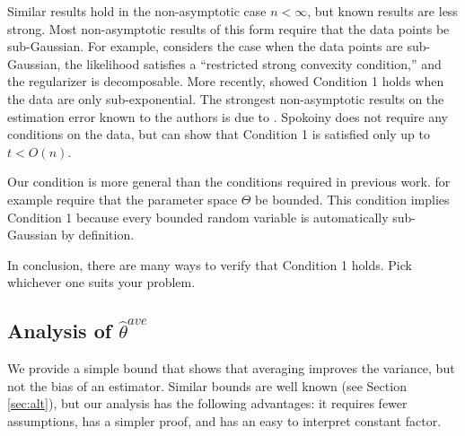 \documentclass[twoside]{article}
\newcommand{\zero}{\text{\textbf{0}}}
\newcommand{\E}{\mathbb{E}}
\newcommand{\w}{\theta}
\newcommand{\wowa}{\hat\w^{owa}}
\newcommand{\wave}{\hat\w^{ave}}
\newcommand{\wmle}{\hat\w^{mle}}
\newcommand{\I}{\mathcal I}
\newcommand{\normal}[2]{\ensuremath{\mathcal{N}\left({{#1}},{{#2}}\right)}}
\begin{document}
Similar results hold in the non-asymptotic case $n<\infty$,
but known results are less strong.
Most non-asymptotic results of this form require that the data points be sub-Gaussian.
For example, \cite{negahban2009unified} considers the case when the data points are sub-Gaussian, the likelihood satisfies a ``restricted strong convexity condition,'' and the regularizer is decomposable.
More recently, \cite{sivakumar2015beyond} showed Condition 1 holds when the data are only sub-exponential.
The strongest non-asymptotic results on the estimation error known to the authors is due to \cite{spokoiny2012parametricestimation}.
Spokoiny does not require any conditions on the data,
but can show that Condition 1 is satisfied only up to $t < O(n)$.

Our condition is more general than the conditions required in previous work.
\cite{zhang2012communication} for example require that the parameter space $\Theta$ be bounded.
This condition implies Condition 1 because every bounded random variable is automatically sub-Gaussian by definition.

In conclusion,
there are many ways to verify that Condition 1 holds.
Pick whichever one suits your problem.

\subsection{Analysis of $\wave$}


We provide a simple bound that shows that averaging improves the variance,
but not the bias of an estimator.
Similar bounds are well known (see Section \ref{sec:alt}),
but our analysis has the following advantages:
it requires fewer assumptions, has a simpler proof, and has an easy to interpret constant factor.
\end{document}
